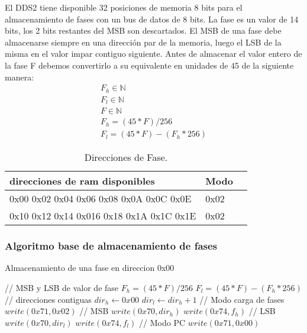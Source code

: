 El DDS2 tiene disponible 32 posiciones de memoria 8 bits para el almacenamiento de fases
con un bus de datos de 8 bits.
La fase es un valor de 14 bits, los 2 bits restantes del MSB son descartados.
El MSB de una fase debe almacenarse siempre en una direcci\'on par de la memoria, luego
el LSB de la misma en el valor impar contiguo siguiente.
Antes de almacenar el valor entero de la fase F debemos convertirlo a su equivalente
en unidades de 45 de la siguiente manera:
\begin{gather}
        F_h \in \mathbb{N} \\
        F_l \in \mathbb{N} \\
        F \in \mathbb{N} \\
        F_h = (45 * F) / 256 \\          
        F_l = (45 * F) - (F_h * 256)
\end{gather}

\begin{table}[ht]
    \centering
    \begin{tabular}{|l|l|l|}
    \hline
    direcciones de ram disponibles           & Modo \\
    \hline
    0x00 0x02 0x04 0x06 0x08 0x0A 0x0C 0x0E  & 0x02 \\
    \hline
    0x10 0x12 0x14 0x016 0x18 0x1A 0x1C 0x1E & 0x02 \\
    \hline
\end{tabular}
\caption{\label{tab:tableTestCases}Direcciones de Fase.}
\end{table}

\subsubsection{Algoritmo base de almacenamiento de fases}
\begin{algorithm}[H]
    \caption{Almacenamiento de una fase en direccion 0x00}\label{algo_phases}
    \begin{algorithmic}[1]
    \State // {MSB y LSB de valor de fase}
    \State $F_h = (45 * F) / 256$         
    \State $F_l = (45 * F) - (F_h * 256)$
    \State // {direcciones contiguas}
    \State $dir_h \gets 0x00$
    \State $dir_l \gets dir_h + 1$
    \State // {Modo carga de fases}
    \State $write(0x71, 0x02)$
    \State // {MSB}
    \State $write(0x70, dir_h)$ 
    \State $write(0x74, f_h)$
    \State // {LSB}
    \State $write(0x70, dir_l)$
    \State $write(0x74, f_l)$
    \State // {Modo PC}
    \State $write(0x71, 0x00)$
    \EndProcedure
    \end{algorithmic}
\end{algorithm}

